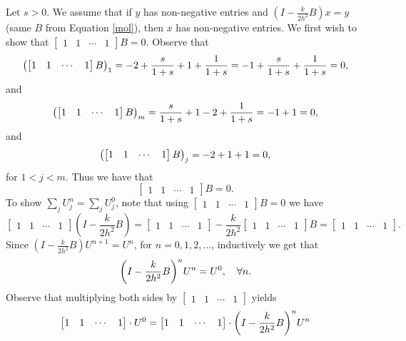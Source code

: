 \documentclass[12pt]{report}
\begin{document}
\begin{solution}

    \noindent
    Let $s > 0$. We assume that if $y$ has non-negative entries and $(I - \frac{k}{2h^2}B)x = y$ (same $B$ from Equation \ref{mol}), then $x$ has non-negative entries. We first wish to show  that $\begin{bmatrix} 1 & 1 & \cdots & 1 \end{bmatrix} B = 0$. Observe that 
    \[ 
      {\left(\begin{bmatrix} 1 & 1 & \cdots & 1 \end{bmatrix} B\right)}_1 = -2 + \frac{s}{1+s }+ 1 + \frac{1}{1 + s} = -1 + \frac{s}{1+s}+\frac{1}{1+s} = 0,
    \]
    and 
    \[ 
      {\left(\begin{bmatrix} 1 & 1 & \cdots & 1 \end{bmatrix} B\right)}_m = \frac{s}{1+s} + 1 - 2 + \frac{1}{1+s} = -1 + 1 = 0,
    \]
    and 
    \[ 
      {\left(\begin{bmatrix} 1 & 1 & \cdots & 1 \end{bmatrix} B\right)}_j = -2 + 1 + 1 = 0,
    \]
    for $1< j < m$. Thus we have that 
    \[ 
      \begin{bmatrix} 1 & 1 & \cdots & 1 \end{bmatrix} B = 0.
    \]
    To show $\sum_j U_j^n = \sum_j U_j^0$, note that using $\begin{bmatrix} 1 & 1 & \cdots & 1 \end{bmatrix} B = 0$ we have
    \[ 
      \begin{bmatrix} 1 & 1 & \cdots & 1 \end{bmatrix}(I - \frac{k}{2h^2}B) = \begin{bmatrix} 1 & 1 & \cdots & 1 \end{bmatrix} - \frac{k}{2h^2} \begin{bmatrix} 1 & 1 & \cdots & 1 \end{bmatrix} B = \begin{bmatrix} 1 & 1 & \cdots & 1 \end{bmatrix}.
    \]
    Since $(I - \frac{k}{2h^2}B) U^{n+1} = U^{n}$, for $n=0,1,2,\dots$, inductively we get that 
    \[
      {\left(I - \frac{k}{2h^2}B\right)}^nU^n = U^0, \quad \forall n.
    \]
    Observe that multiplying both sides by $\begin{bmatrix} 1 & 1 & \cdots & 1 \end{bmatrix}$ yields
    \begin{align*}
      \begin{bmatrix} 1 & 1 & \cdots & 1 \end{bmatrix} \cdot U^0 &= \begin{bmatrix} 1 & 1 & \cdots & 1 \end{bmatrix} \cdot \paren{I - \frac{k}{2h^2}B}^n U^n \\

\end{align*}
\end{solution}
\end{document}

